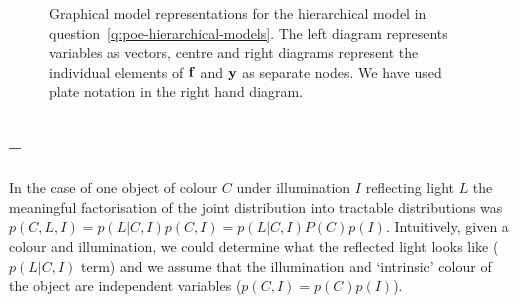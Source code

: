 \documentclass[a4paper]{article}
\newcommand{\questionref}[1]{\Cref{#1} -- \nameref{#1}}
\theoremstyle{definition}
\begin{document}
\begin{figure}[h]
\centering
{}
\hspace{1.0cm}
\hspace{1.0cm}
\caption{Graphical model representations for the hierarchical model in question~\ref{q:poe-hierarchical-models}. The left diagram represents variables as vectors, centre and right diagrams represent the individual elements of $\mathbf{f}$ and $\mathbf{y}$ as separate nodes. We have used plate notation in the right hand diagram.}
\label{fig:gm-hierarchical}
\end{figure}


\subsection{\questionref{q:gm-reflection}}
In the case of one object of colour $C$ under illumination $I$ reflecting light $L$ the meaningful factorisation of the joint distribution into tractable distributions was $p(C, L, I) = p(L|C, I) p(C, I) = p(L|C, I) P(C) p(I)$. Intuitively, given a colour and illumination, we could determine what the reflected light looks like ($p(L|C, I)$ term) and we assume that the illumination and `intrinsic' colour of the object are independent variables ($p(C, I) = p(C) p(I)$).
\end{document}
